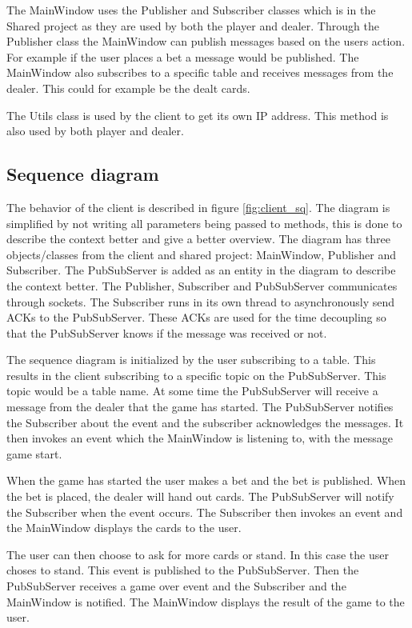 The MainWindow uses the Publisher and Subscriber classes which is in the Shared project as they are used by both the player and dealer. Through the Publisher class the MainWindow can publish messages based on the users action. For example if the user places a bet a message would be published. The MainWindow also subscribes to a specific table and receives messages from the dealer. This could for example be the dealt cards.

The Utils class is used by the client to get its own IP address. This method is also used by both player and dealer.

\FloatBarrier

\subsection{Sequence diagram}
The behavior of the client is described in figure \ref{fig:client_sq}. The diagram is simplified by not writing all parameters being passed to methods, this is done to describe the context better and give a better overview. The diagram has three objects/classes from the client and shared project: MainWindow, Publisher and Subscriber. The PubSubServer is added as an entity in the diagram to describe the context better. The Publisher, Subscriber and PubSubServer communicates through sockets. The Subscriber runs in its own thread to asynchronously send ACKs to the PubSubServer. These ACKs are used for the time decoupling so that the PubSubServer knows if the message was received or not.

The sequence diagram is initialized by the user subscribing to a table. This results in the client subscribing to a specific topic on the PubSubServer. This topic would be a table name. At some time the PubSubServer will receive a message from the dealer that the game has started. The PubSubServer notifies the Subscriber about the event and the subscriber acknowledges the messages. It then invokes an event which the MainWindow is listening to, with the message game start. 

When the game has started the user makes a bet and the bet is published. When the bet is placed, the dealer will hand out cards. The PubSubServer will notify the Subscriber when the event occurs. The Subscriber then invokes an event and the MainWindow displays the cards to the user. 

The user can then choose to ask for more cards or stand. In this case the user choses to stand. This event is published to the PubSubServer. Then the PubSubServer receives a game over event and the Subscriber and the MainWindow is notified. The MainWindow displays the result of the game to the user.

